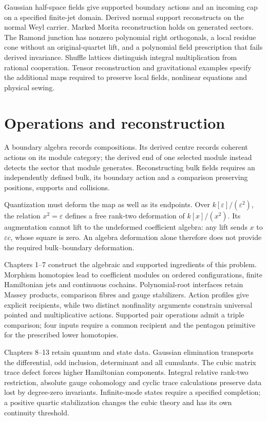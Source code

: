 \documentclass[11pt,twoside,openright]{memoir}
\begin{document}
Gaussian half-space fields give supported boundary actions and an incoming cap on a specified finite-jet domain. Derived normal support reconstructs on the normal Weyl carrier. Marked Morita reconstruction holds on generated sectors. The Ramond junction has nonzero polynomial right orthogonals, a local residue cone without an original-quartet lift, and a polynomial field prescription that fails derived invariance. Shuffle lattices distinguish integral multiplication from rational cooperation. Tensor reconstruction and gravitational examples specify the additional maps required to preserve local fields, nonlinear equations and physical sewing.

\chapter*{Operations and reconstruction}
A boundary algebra records compositions. Its derived centre records coherent actions on its module category; the derived end of one selected module instead detects the sector that module generates. Reconstructing bulk fields requires an independently defined bulk, its boundary action and a comparison preserving positions, supports and collisions.

Quantization must deform the map as well as its endpoints. Over \(k[\varepsilon]/(\varepsilon^2)\), the relation \(x^2=\varepsilon\) defines a free rank-two deformation of \(k[x]/(x^2)\). Its augmentation cannot lift to the undeformed coefficient algebra: any lift sends \(x\) to \(\varepsilon c\), whose square is zero. An algebra deformation alone therefore does not provide the required bulk--boundary deformation.

Chapters 1--7 construct the algebraic and supported ingredients of this problem. Morphism homotopies lead to coefficient modules on ordered configurations, finite Hamiltonian jets and continuous cochains. Polynomial-root interfaces retain Massey products, comparison fibres and gauge stabilizers. Action profiles give explicit recipients, while two distinct nonfinality arguments constrain universal pointed and multiplicative actions. Supported pair operations admit a triple comparison; four inputs require a common recipient and the pentagon primitive for the prescribed lower homotopies.

Chapters 8--13 retain quantum and state data. Gaussian elimination transports the differential, odd inclusion, determinant and all cumulants. The cubic matrix trace defect forces higher Hamiltonian components. Integral relative rank-two restriction, absolute gauge cohomology and cyclic trace calculations preserve data lost by degree-zero invariants. Infinite-mode states require a specified completion; a positive quartic stabilization changes the cubic theory and has its own continuity threshold.
\end{document}
